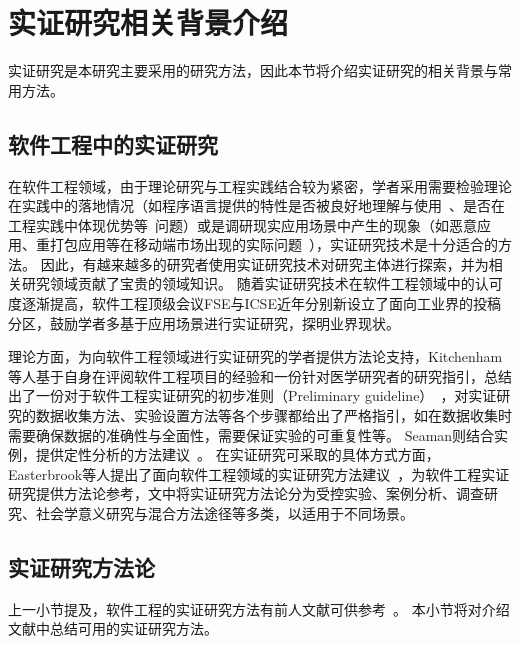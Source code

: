 \section{实证研究相关背景介绍}
实证研究是本研究主要采用的研究方法，因此本节将介绍实证研究的相关背景与常用方法。

\subsection{软件工程中的实证研究}
在软件工程领域，由于理论研究与工程实践结合较为紧密，学者采用需要检验理论在实践中的落地情况（如程序语言提供的特性是否被良好地理解与使用~\cite{bieman1995reuse}、是否在工程实践中体现优势等~\cite{harrison2000experimental}问题）或是调研现实应用场景中产生的现象（如恶意应用、重打包应用等在移动端市场出现的实际问题~\cite{Felt2011ASO, Zhou2012DissectingAM, Andow2016ASO, wang2018android}），实证研究技术是十分适合的方法。
因此，有越来越多的研究者使用实证研究技术对研究主体进行探索\cite{Felt2011ASO, Zhou2012DissectingAM, Andow2016ASO, wang2018android, chen2018ausera, chen2018mobile, bieman1995reuse, harrison2000experimental, dybaa2008empirical, manotas2016empirical, mcintosh2016empirical, mcilroy2016fresh, wu2016ji, yang2015xin, hu2019dating, khanmohammadi2019empirical}，并为相关研究领域贡献了宝贵的领域知识。
随着实证研究技术在软件工程领域中的认可度逐渐提高，软件工程顶级会议FSE与ICSE近年分别新设立了面向工业界的投稿分区，鼓励学者多基于应用场景进行实证研究，探明业界现状。

理论方面，为向软件工程领域进行实证研究的学者提供方法论支持，Kitchenham等人基于自身在评阅软件工程项目的经验和一份针对医学研究者的研究指引，总结出了一份对于软件工程实证研究的初步准则（Preliminary guideline）~\cite{kitchenham2002preliminary}，对实证研究的数据收集方法、实验设置方法等各个步骤都给出了严格指引，如在数据收集时需要确保数据的准确性与全面性，需要保证实验的可重复性等。
Seaman则结合实例，提供定性分析的方法建议~\cite{seaman1999qualitative}。
在实证研究可采取的具体方式方面，Easterbrook等人提出了面向软件工程领域的实证研究方法建议~\cite{easterbrook2008selecting}，为软件工程实证研究提供方法论参考，文中将实证研究方法论分为受控实验、案例分析、调查研究、社会学意义研究与混合方法途径等多类，以适用于不同场景。

\subsection{实证研究方法论}
上一小节提及，软件工程的实证研究方法有前人文献可供参考~\cite{easterbrook2008selecting}。
本小节将对介绍文献中总结可用的实证研究方法。

